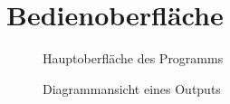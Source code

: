\section{Bedienoberfläche}

\setlength \fboxsep{1cm}
\begin{figure}[h!]
	\centering
	\caption{Hauptoberfläche des Programms}
\end{figure}
\begin{figure}[h!]
	\centering
	\caption{Diagrammansicht eines Outputs}
\end{figure}
